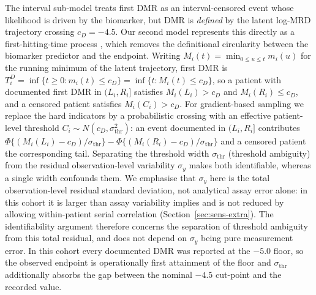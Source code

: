 \documentclass[11pt]{article}
\begin{document}
The interval sub-model treats first DMR as an interval-censored event whose
likelihood is driven by the biomarker, but DMR is \emph{defined} by the latent
log-MRD trajectory crossing $c_D=-4.5$. Our second model represents this
directly as a first-hitting-time process
\cite{LeeWhitmore2006ThresholdRegression,AalenGjessing2001ProcessView}, which
removes the definitional circularity between the biomarker predictor and the
endpoint. Writing $M_i(t)=\min_{0\le u\le t}m_i(u)$ for the running minimum of
the latent trajectory, first DMR is
$T_i^D=\inf\{t\ge 0:m_i(t)\le c_D\}=\inf\{t:M_i(t)\le c_D\}$, so a patient with
documented first DMR in $(L_i,R_i]$ satisfies $M_i(L_i)>c_D$ and
$M_i(R_i)\le c_D$, and a censored patient satisfies $M_i(C_i)>c_D$. For
gradient-based sampling we replace the hard indicators by a probabilistic
crossing with an effective patient-level threshold
$C_i\sim N(c_D,\sigma_{\mathrm{thr}}^2)$: an event documented in $(L_i,R_i]$
contributes
$\Phi\{(M_i(L_i)-c_D)/\sigma_{\mathrm{thr}}\}-\Phi\{(M_i(R_i)-c_D)/\sigma_{\mathrm{thr}}\}$
and a censored patient the corresponding tail. Separating the threshold width
$\sigma_{\mathrm{thr}}$ (threshold ambiguity) from the residual observation-level
variability $\sigma_y$ makes both identifiable, whereas a single width confounds
them. We emphasise that $\sigma_y$ here is the total observation-level residual
standard deviation, not analytical assay error alone: in this cohort it is larger
than assay variability implies and is not reduced by allowing within-patient serial
correlation (Section~\ref{sec:sens-extra}). The identifiability argument therefore
concerns the separation of threshold ambiguity from this total residual, and does
not depend on $\sigma_y$ being pure measurement error. In
this cohort every documented DMR was reported at the $-5.0$ floor, so the
observed endpoint is operationally first attainment of the floor and
$\sigma_{\mathrm{thr}}$ additionally absorbs the gap between the nominal $-4.5$
cut-point and the recorded value.
\end{document}
